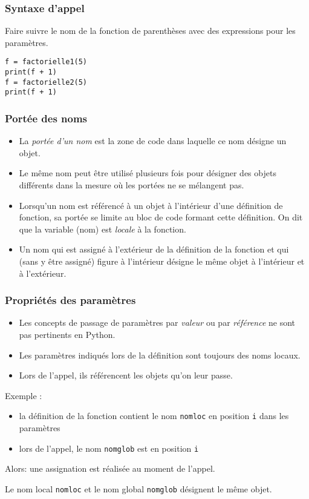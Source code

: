 \begin{frame}[fragile]
  \frametitle{Syntaxe d'appel}
Faire suivre le nom de la fonction de parenthèses avec des expressions pour les paramètres.
\begin{verbatim}
f = factorielle1(5)
print(f + 1)
f = factorielle2(5)
print(f + 1)
\end{verbatim}
\end{frame}

\begin{frame}
  \frametitle{Portée des noms}
\begin{itemize}
  \item La \emph{portée d'un nom} est la zone de code dans laquelle ce nom désigne un objet.
  \item Le même nom peut être utilisé plusieurs fois pour désigner des objets différents dans la mesure où les portées ne se mélangent pas.
  \item Lorsqu'un nom est référencé à un objet à l'intérieur d'une définition de fonction, sa portée se limite au bloc de code formant cette définition. On dit que la variable (nom) est \emph{locale} à la fonction.
  \item Un nom qui est assigné à l'extérieur de la définition de la fonction et qui (sans y être assigné) figure à l'intérieur désigne le même objet à l'intérieur et à l'extérieur.
\end{itemize}
\end{frame}

\begin{frame}
  \frametitle{Propriétés des paramètres}
\begin{itemize}
  \item Les concepts de passage de paramètres par \emph{valeur} ou par \emph{référence} ne sont pas pertinents en Python.
  \item Les paramètres indiqués lors de la définition sont toujours des noms locaux.
  \item Lors de l'appel, ils référencent les objets qu'on leur passe.
\end{itemize}
Exemple :
\begin{itemize}
  \item la définition de la fonction contient le nom \texttt{nomloc} en position \texttt{i} dans les paramètres
  \item lors de l'appel, le nom \texttt{nomglob} est en position \texttt{i}
\end{itemize}
Alors: une assignation est réalisée au moment de l'appel.

Le nom local \texttt{nomloc} et le nom global \texttt{nomglob} désignent le même objet.\newline
\end{frame}

